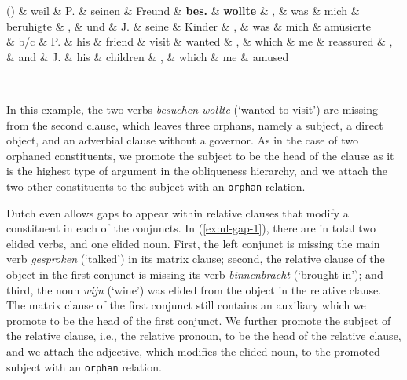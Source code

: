 \documentclass[lucida,biblatex]{sp} %
\newcounter{excounter}
\begin{document}
\begin{center}
  \label{ex:de-gap-1}
  \scriptsize
  \begin{dependency}[edge unit distance=2.5ex]
    \begin{deptext}[column sep=-0.05cm]
      (\theexcounter) 
    \& weil \& P. \& seinen \& Freund \& \textbf{bes.} \& \textbf{wollte} \& , \& was \& mich \& beruhigte \& , \& und \& J. \& seine \& Kinder \& , \& was \& mich \& am\"usierte \\
      \& b/c \& P. \& his \& friend \& visit \& wanted \& , \& which \& me \& reassured \& , \& and \& J. \& his \& children \& , \& which \& me \& amused \\
    \end{deptext}
  \end{dependency}
   \\ \normalsize \null \hfill \citep{Wyngaerd2007}
  \end{center}

\noindent In this example, the two verbs \textit{besuchen wollte} (`wanted to visit') are missing from the second clause, which leaves three orphans, namely a subject, a direct object, and an adverbial clause without a governor. As in the case of two orphaned constituents, we promote the subject to be the head of the clause as it is the highest type of argument in the obliqueness hierarchy, and we attach the two other constituents to the subject with an \texttt{orphan} relation.



Dutch even allows gaps to appear within relative clauses that modify a constituent in each of the conjuncts. In (\ref{ex:nl-gap-1}), there are in total two elided verbs, and one elided noun. First, the left conjunct is missing the main verb \textit{gesproken} (`talked') in its matrix clause; second, the relative clause of the object in the first conjunct is missing its verb \textit{binnenbracht} (`brought in'); and third, the noun \textit{wijn} (`wine') was elided from the object in the relative clause. The matrix clause of the first conjunct still contains an auxiliary which we 
promote to be the head of the first conjunct. We further promote the subject of the relative clause, i.e., the relative pronoun, to be the head of the relative clause, and we attach the adjective, which modifies the elided noun, to the promoted subject with an \texttt{orphan} relation.
\end{document}
